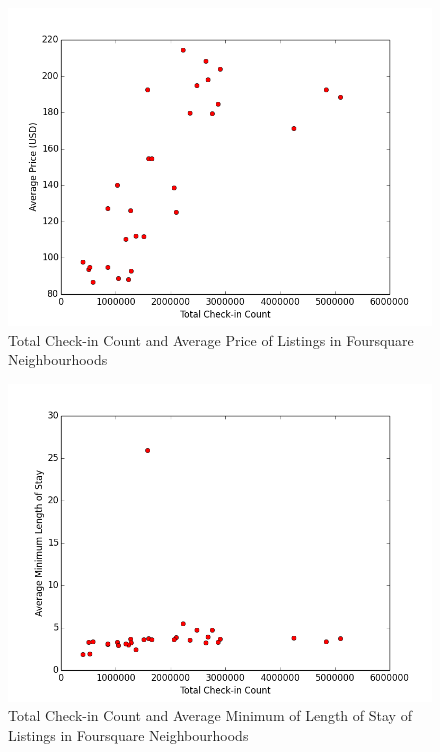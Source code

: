 \begin{figure}
\centering
\includegraphics[width=\columnwidth]{../checkin_avg_price.png}
\caption{Total Check-in Count and Average Price of Listings in Foursquare Neighbourhoods}
\label{fig:checkin_avg_price}
\end{figure}
\begin{figure}
\centering
\includegraphics[width=\columnwidth]{../checkin_avg_length.png}
\caption{Total Check-in Count and Average Minimum of Length of Stay of Listings in Foursquare Neighbourhoods}
\label{fig:checkin_avg_length}
\end{figure}